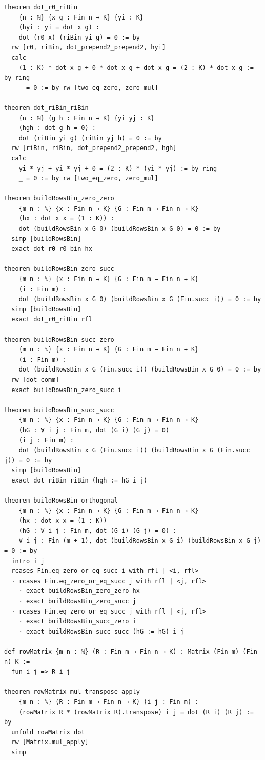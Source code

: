 \documentclass[12pt]{article}
\begin{document}
\begin{lstlisting}[caption={Lean verification for Theorem~\ref{thm:CZ_Kim_Lagrangian}.}]
theorem dot_r0_riBin
    {n : ℕ} {x g : Fin n → K} {yi : K}
    (hyi : yi = dot x g) :
    dot (r0 x) (riBin yi g) = 0 := by
  rw [r0, riBin, dot_prepend2_prepend2, hyi]
  calc
    (1 : K) * dot x g + 0 * dot x g + dot x g = (2 : K) * dot x g := by ring
    _ = 0 := by rw [two_eq_zero, zero_mul]

theorem dot_riBin_riBin
    {n : ℕ} {g h : Fin n → K} {yi yj : K}
    (hgh : dot g h = 0) :
    dot (riBin yi g) (riBin yj h) = 0 := by
  rw [riBin, riBin, dot_prepend2_prepend2, hgh]
  calc
    yi * yj + yi * yj + 0 = (2 : K) * (yi * yj) := by ring
    _ = 0 := by rw [two_eq_zero, zero_mul]

theorem buildRowsBin_zero_zero
    {m n : ℕ} {x : Fin n → K} {G : Fin m → Fin n → K}
    (hx : dot x x = (1 : K)) :
    dot (buildRowsBin x G 0) (buildRowsBin x G 0) = 0 := by
  simp [buildRowsBin]
  exact dot_r0_r0_bin hx

theorem buildRowsBin_zero_succ
    {m n : ℕ} {x : Fin n → K} {G : Fin m → Fin n → K}
    (i : Fin m) :
    dot (buildRowsBin x G 0) (buildRowsBin x G (Fin.succ i)) = 0 := by
  simp [buildRowsBin]
  exact dot_r0_riBin rfl

theorem buildRowsBin_succ_zero
    {m n : ℕ} {x : Fin n → K} {G : Fin m → Fin n → K}
    (i : Fin m) :
    dot (buildRowsBin x G (Fin.succ i)) (buildRowsBin x G 0) = 0 := by
  rw [dot_comm]
  exact buildRowsBin_zero_succ i

theorem buildRowsBin_succ_succ
    {m n : ℕ} {x : Fin n → K} {G : Fin m → Fin n → K}
    (hG : ∀ i j : Fin m, dot (G i) (G j) = 0)
    (i j : Fin m) :
    dot (buildRowsBin x G (Fin.succ i)) (buildRowsBin x G (Fin.succ j)) = 0 := by
  simp [buildRowsBin]
  exact dot_riBin_riBin (hgh := hG i j)

theorem buildRowsBin_orthogonal
    {m n : ℕ} {x : Fin n → K} {G : Fin m → Fin n → K}
    (hx : dot x x = (1 : K))
    (hG : ∀ i j : Fin m, dot (G i) (G j) = 0) :
    ∀ i j : Fin (m + 1), dot (buildRowsBin x G i) (buildRowsBin x G j) = 0 := by
  intro i j
  rcases Fin.eq_zero_or_eq_succ i with rfl | <i, rfl>
  · rcases Fin.eq_zero_or_eq_succ j with rfl | <j, rfl>
    · exact buildRowsBin_zero_zero hx
    · exact buildRowsBin_zero_succ j
  · rcases Fin.eq_zero_or_eq_succ j with rfl | <j, rfl>
    · exact buildRowsBin_succ_zero i
    · exact buildRowsBin_succ_succ (hG := hG) i j

def rowMatrix {m n : ℕ} (R : Fin m → Fin n → K) : Matrix (Fin m) (Fin n) K :=
  fun i j => R i j

theorem rowMatrix_mul_transpose_apply
    {m n : ℕ} (R : Fin m → Fin n → K) (i j : Fin m) :
    (rowMatrix R * (rowMatrix R).transpose) i j = dot (R i) (R j) := by
  unfold rowMatrix dot
  rw [Matrix.mul_apply]
  simp


\end{lstlisting}
\end{document}
